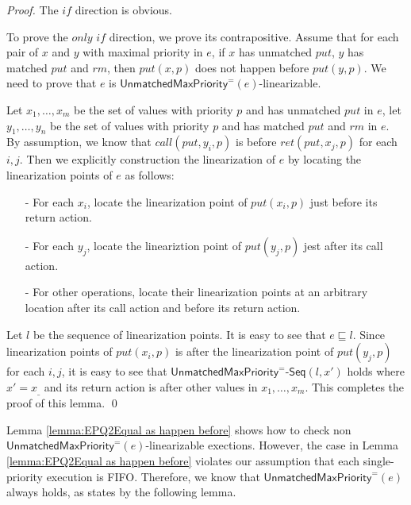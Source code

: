 \begin {proof}

The $\textit{if}$ direction is obvious.

To prove the $\textit{only if}$ direction, we prove its contrapositive. Assume that for each pair of $x$ and $y$ with maximal priority in $e$, if $x$ has unmatched $\textit{put}$, $y$ has matched $\textit{put}$ and $\textit{rm}$, then $\textit{put}(x,p)$ does not happen before $\textit{put}(y,p)$. We need to prove that $e$ is $\mathsf{UnmatchedMaxPriority}^{=}(e)$-linearizable.

Let $x_1,\ldots,x_m$ be the set of values with priority $p$ and has unmatched $\textit{put}$ in $e$, let $y_1,\ldots,y_n$ be the set of values with priority $p$ and has matched $\textit{put}$ and $\textit{rm}$ in $e$. By assumption, we know that $\textit{call}(\textit{put},y_i,p)$ is before $\textit{ret}(\textit{put},x_j,p)$ for each $i,j$. Then we explicitly construction the linearization of $e$ by locating the linearization points of $e$ as follows:

\begin{itemize}
\setlength{\itemsep}{0.5pt}
\item[-] For each $x_i$, locate the linearization point of $\textit{put}(x_i,p)$ just before its return action.

\item[-] For each $y_j$, locate the lineariztion point of $\textit{put}(y_j,p)$ jest after its call action.

\item[-] For other operations, locate their linearization points at an arbitrary location after its call action and before its return action.
\end{itemize}

Let $l$ be the sequence of linearization points. It is easy to see that $e \sqsubseteq l$. Since linearization points of $\textit{put}(x_i,p)$ is after the linearization point of $\textit{put}(y_j,p)$ for each $i,j$, it is easy to see that $\mathsf{UnmatchedMaxPriority}^{=}\mathsf{\text{-}Seq}(l,x')$ holds where $x' = x_{\_}$ and its return action is after other values in $x_1,\ldots,x_m$. This completes the proof of this lemma. \qed
\end {proof}

Lemma \ref{lemma:EPQ2Equal as happen before} shows how to check non $\mathsf{UnmatchedMaxPriority}^{=}(e)$-linearizable exections. However, the case in Lemma \ref{lemma:EPQ2Equal as happen before} violates our assumption that each single-priority execution is FIFO. Therefore, we know that $\mathsf{UnmatchedMaxPriority}^{=}(e)$ always holds, as states by the following lemma.

